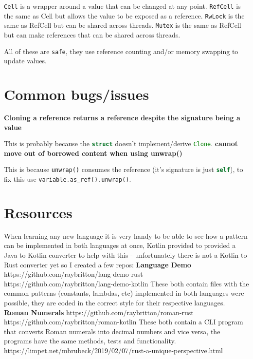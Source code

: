 \documentclass[a4paper,11pt]{article}
\begin{document}
\lstinline[language=Rust]{Cell} is a wrapper around a value that can be changed at any point.
\newline
\lstinline[language=Rust]{RefCell} is the same as Cell but allows the value to be exposed as a reference.
\newline
\lstinline[language=Rust]{RwLock} is the same as RefCell but can be shared across threads.
\newline
\lstinline[language=Rust]{Mutex} is the same as RefCell but can make references that can be shared across threads.

All of these are \lstinline{safe}, they use reference counting and/or memory swapping to update values.

\newpage
\section{Common bugs/issues}

\textbf{Cloning a reference returns a reference despite the signature being a value}
\newline

This is probably because the \lstinline[language=Rust]{struct} doesn't implement/derive \lstinline[language=Rust]{Clone}.
\medskip
\textbf{cannot move out of borrowed content when using unwrap()}
\newline

This is because \lstinline[language=Rust]{unwrap()} consumes the reference (it's signature is just \lstinline[language=Rust]{self}), to fix this use
\lstinline[language=Rust]{variable.as_ref().unwrap()}.

\newpage
\section{Resources}

When learning any new language it is very handy to be able to see how a pattern can be implemented in both languages at once, Kotlin provided to provided a Java to Kotlin converter to help with this - unfortunately there is not a Kotlin to Rust converter yet so I created a few repos:
\medskip
\textbf{Language Demo}
\newline
https://github.com/raybritton/lang-demo-rust
\newline
https://github.com/raybritton/lang-demo-kotlin
\newline
These both contain files with the common patterns (constants, lambdas, etc) implemented in both languages were possible, they are coded in the correct style for their respective languages. 
\newline
\newline
\textbf{Roman Numerals}
\newline
https://github.com/raybritton/roman-rust
\newline
https://github.com/raybritton/roman-kotlin
\newline
These both contain a CLI program that converts Roman numerals into decimal numbers and vice versa, the programs have the same methods, tests and functionality.\newline
https://limpet.net/mbrubeck/2019/02/07/rust-a-unique-perspective.html
\end{document}
